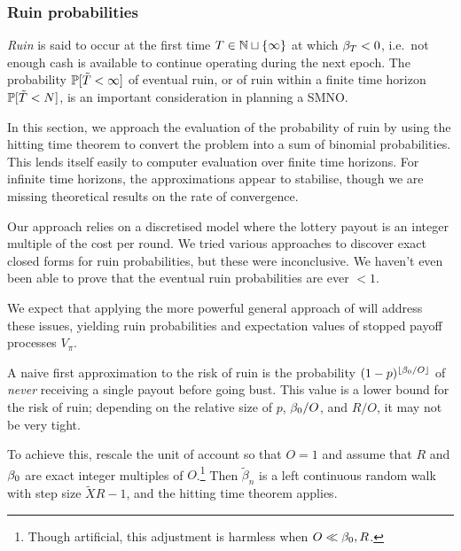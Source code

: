 \subsubsection{Ruin probabilities}
\label{section:ruin}

\emph{Ruin} is said to occur at the first time $T\in\mathbb{N}\sqcup\{\infty\}$ at which $\beta_T < 0$, i.e.~not enough cash is available to continue operating during the next epoch.
%
The probability $\mathbb{P}[\tilde{T}<\infty]$ of eventual ruin, or of ruin within a finite time horizon $\mathbb{P}[\tilde{T}<N]$, is an important consideration in planning a SMNO.


In this section, we approach the evaluation of the probability of ruin by using the hitting time theorem to convert the problem into a sum of binomial probabilities.
%
This lends itself easily to computer evaluation over finite time horizons.
%
For infinite time horizons, the approximations appear to stabilise, though we are missing theoretical results on the rate of convergence.


\begin{remark}

Our approach relies on a discretised model where the lottery payout is an integer multiple of the cost per round.
%
We tried various approaches to discover exact closed forms for ruin probabilities, but these were inconclusive.
%
We haven't even been able to prove that the eventual ruin probabilities are ever $<1$.

We expect that applying the more powerful general approach of \cite{asmussen2010ruin,hansjoerg2022profitability} will address these issues, yielding ruin probabilities and expectation values of stopped payoff processes $V_\pi$.

\end{remark}

\begin{remark}
  
  A naive first approximation to the risk of ruin is the probability $(1-p)^{\left\lfloor \beta_0/O \right\rfloor}$ of \emph{never} receiving a single payout before going bust.
  This value is a lower bound for the risk of ruin; depending on the relative size of $p$, $\beta_0/O$, and $R/O$, it may not be very tight.
  
\end{remark}


To achieve this, rescale the unit of account so that $O=1$ and assume that $R$ and $\beta_0$ are exact integer multiples of $O$.\footnote{Though artificial, this adjustment is harmless when $O\ll \beta_0,R$.}
%
Then $\tilde{\beta}_n$ is a left continuous random walk with step size $\tilde{X}R-1$, and the hitting time theorem \cite[Thm.~5.3.7]{grimmett2020probability} applies.

